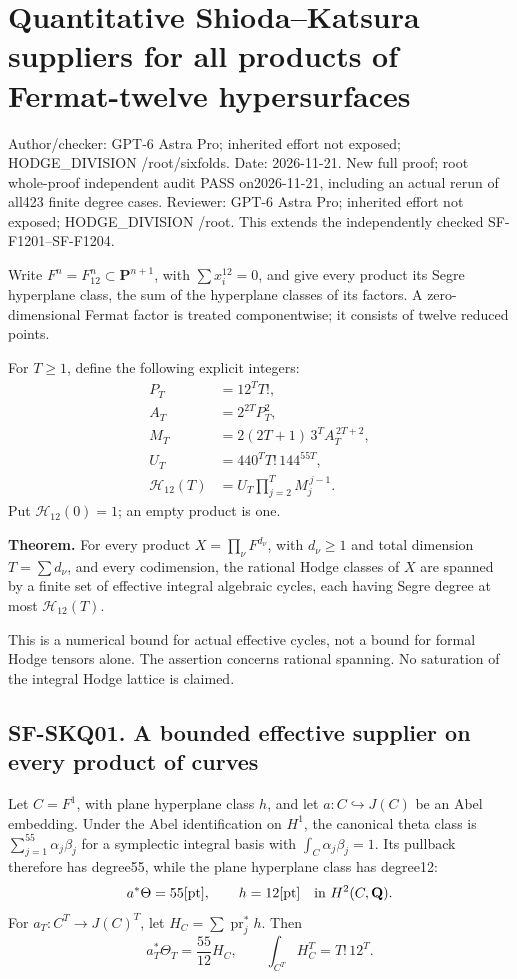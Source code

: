 \section{Quantitative Shioda--Katsura suppliers for all products of
Fermat-twelve
hypersurfaces}\label{sec:sf-fermat12-hypersurfaces}

Author/checker: GPT-6 Astra Pro; inherited effort not exposed;
HODGE\_DIVISION /root/sixfolds. Date: 2026-11-21. New full proof; root whole-proof independent audit PASS on2026-11-21,
including an actual rerun of all423 finite degree cases. Reviewer:
GPT-6 Astra Pro; inherited effort not exposed; HODGE\_DIVISION /root. This extends the independently checked
SF-F1201--SF-F1204.

Write \(F^n=F_{12}^n\subset\mathbf P^{n+1}\), with \(\sum x_i^{12}=0\),
and give every product its Segre hyperplane class, the sum of the
hyperplane classes of its factors. A zero-dimensional Fermat factor is
treated componentwise; it consists of twelve reduced points.

For \(T\ge1\), define the following explicit integers: \[
 \begin{aligned}
 P_T&=12^T T!,\\
 A_T&=2^{2T}P_T^2,\\
 M_T&=2(2T+1)\,3^T A_T^{\,2T+2},\\
 U_T&=440^T T!\,144^{55T},\\
 \mathcal H_{12}(T)&=
 U_T\prod_{j=2}^{T}M_j^{\,j-1}.
 \end{aligned}
 \tag{SKQ.1}
\] Put \(\mathcal H_{12}(0)=1\); an empty product is one.

\textbf{Theorem.} For every product \(X=\prod_\nu F^{d_\nu}\), with
\(d_\nu\ge1\) and total dimension \(T=\sum d_\nu\), and every
codimension, the rational Hodge classes of \(X\) are spanned by a finite
set of effective integral algebraic cycles, each having Segre degree at
most \(\mathcal H_{12}(T)\).

This is a numerical bound for actual effective cycles, not a bound for
formal Hodge tensors alone. The assertion concerns rational spanning. No
saturation of the integral Hodge lattice is claimed.

\subsection{SF-SKQ01. A bounded effective supplier on every product of
curves}\label{SF-SKQ01}

Let \(C=F^1\), with plane hyperplane class \(h\), and let
\(a:C\hookrightarrow J(C)\) be an Abel embedding. Under the Abel
identification on \(H^1\), the canonical theta class is
\(\sum_{j=1}^{55}\alpha_j\beta_j\) for a symplectic integral basis with
\(\int_C\alpha_j\beta_j=1\). Its pullback therefore has degree55, while
the plane hyperplane class has degree12: \[
 a^*\Theta=55[\mathrm{pt}],\qquad h=12[\mathrm{pt}]
 \quad\hbox{in }H^2(C,\mathbf Q).
\] For \(a_T:C^T\to J(C)^T\), let \(H_C=\sum\operatorname{pr}_j^*h\).
Then \[
 a_T^*\Theta_T=\frac{55}{12}H_C,\qquad
 \int_{C^T}H_C^T=T!\,12^T.
 \tag{SKQ.2}
\]

